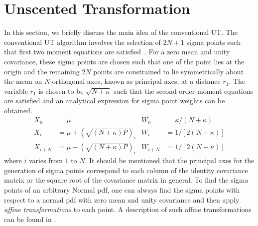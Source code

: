 \documentclass[letterpaper, 10 pt, conference]{IEEEtran}  %
\begin{document}
\section{Unscented Transformation}
In this section, we briefly discuss the main idea of the conventional UT. The conventional UT algorithm involves the selection of $2N+1$ sigma points such that first two moment equations are satisfied~\cite{jul1}. For a zero mean and unity covariance, these sigma points are chosen such that one of the point lies at the origin and the remaining $2N$ points are constrained to lie symmetrically about the mean on $N$-orthogonal axes, known as principal axes, at a distance $r_1$. The variable $r_1$ is chosen to be $\sqrt{N+\kappa}$  such that the second order moment equations are satisfied and an analytical expression for sigma point weights can be obtained. 
\begin{align}
X_0&=\mu  &W_0&={\kappa}/{(N+\kappa)}\label{UTw0}\\
X_i&=\mu+(\sqrt{(N+\kappa)P})_i  &W_i&={1}/{[2(N+\kappa)]} \label{UTw1}\\
X_{i+N}&=\mu-(\sqrt{(N+\kappa)P})_i 	 &W_{i+N}&={1}/{[2(N+\kappa)]}\label{UTw2}
\end{align}
where $i$ varies from $1$ to $N$. It should be mentioned that the principal axes for the generation of sigma points correspond to each column of the identity covariance matrix or the square root of the covariance matrix in general. To find the sigma points of an arbitrary Normal pdf, one can always find the sigma points with respect to a normal pdf with zero mean and unity covariance and then apply \emph{affine transformations} to each point. A description of such affine transformations can be found in \cite{strACMI,Arackf}.   
\end{document}
